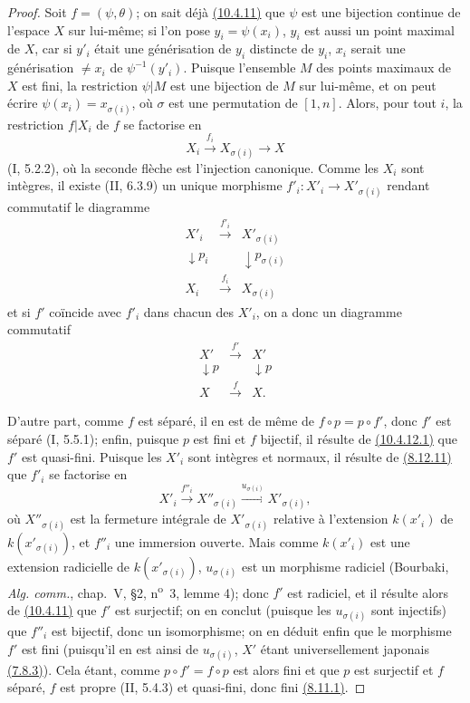 \begin{proof}
Soit $f=(\psi,\theta)$; on sait déjà
{\hyperlink{ega4.c04.statement.10-4-11}{(10.4.11)}} que $\psi$ est une
bijection continue de l'espace $X$ sur lui-même; si l'on pose
$y_i=\psi(x_i)$, $y_i$ est aussi un point maximal de $X$, car si $y'_i$
était une générisation de $y_i$ distincte de $y_i$, $x_i$ serait une
générisation $\neq x_i$ de $\psi^{-1}(y'_i)$. Puisque l'ensemble $M$
des points maximaux de $X$ est fini, la restriction $\psi|M$ est une
bijection de $M$ sur lui-même, et on peut écrire
$\psi(x_i)=x_{\sigma(i)}$, où $\sigma$ est une permutation de
$[1,n]$. Alors, pour tout $i$, la restriction $f|X_i$ de $f$ se
factorise en
\[
 X_i\xrightarrow{f_i}X_{\sigma(i)}\longrightarrow X
\]
(I, 5.2.2), où la seconde flèche est l'injection canonique. Comme les
$X_i$ sont intègres, il existe (II, 6.3.9) un unique morphisme
$f'_i:X'_i\to X'_{\sigma(i)}$ rendant commutatif le diagramme
\[
\begin{array}{ccc}
X'_i&\xrightarrow{f'_i}&X'_{\sigma(i)}\\
\downarrow p_i&&\downarrow p_{\sigma(i)}\\
X_i&\xrightarrow{f_i}&X_{\sigma(i)}
\end{array}
\]
et si $f'$ coïncide avec $f'_i$ dans chacun des $X'_i$, on a donc un
diagramme commutatif
\label{IV.10.4.12.1}
\begin{equation}
\label{IV.10.4.12.1.errata}
\begin{array}{ccc}
X'&\xrightarrow{f'}&X'\\
\downarrow p&&\downarrow p\\
X&\xrightarrow{f}&X.
\end{array}
\tag{10.4.12.1}
\end{equation}

D'autre part, comme $f$ est séparé, il en est de même de
$f\circ p=p\circ f'$, donc $f'$ est séparé (I, 5.5.1); enfin, puisque
$p$ est fini et $f$ bijectif, il résulte de
{\hyperlink{ega4.c04.sec.10-4-12-1}{(10.4.12.1)}} que $f'$ est
quasi-fini. Puisque les $X'_i$ sont intègres et normaux, il résulte de
{\hyperlink{ega4.c04.cor.8-12-11}{(8.12.11)}} que $f'_i$ se factorise en
\[
 X'_i\xrightarrow{f''_i}X''_{\sigma(i)}
 \xrightarrow{u_{\sigma(i)}}X'_{\sigma(i)},
\]
où $X''_{\sigma(i)}$ est la fermeture intégrale de
$X'_{\sigma(i)}$ relative à l'extension $k(x'_i)$ de
$k(x'_{\sigma(i)})$, et $f''_i$ une immersion ouverte. Mais comme
$k(x'_i)$ est une extension radicielle de $k(x'_{\sigma(i)})$,
$u_{\sigma(i)}$ est un morphisme radiciel (Bourbaki,
\emph{Alg. comm.}, chap.~V, \S2, n\textsuperscript{o}~3, lemme 4);
donc $f'$ est radiciel, et il résulte alors de
{\hyperlink{ega4.c04.statement.10-4-11}{(10.4.11)}} que $f'$ est
surjectif; on en conclut (puisque les $u_{\sigma(i)}$ sont injectifs)
que $f''_i$ est bijectif, donc un isomorphisme; on en déduit enfin que
le morphisme $f'$ est fini (puisqu'il en est ainsi de $u_{\sigma(i)}$,
$X'$ étant universellement japonais
{\hyperlink{ega4.c04.statement.7-8-3}{(7.8.3)}}). Cela étant, comme
$p\circ f'=f\circ p$ est alors fini et que $p$ est surjectif et $f$
séparé, $f$ est propre (II, 5.4.3) et quasi-fini, donc fini
{\hyperlink{ega4.c04.thm.8-11-1}{(8.11.1)}}.


\end{proof}
